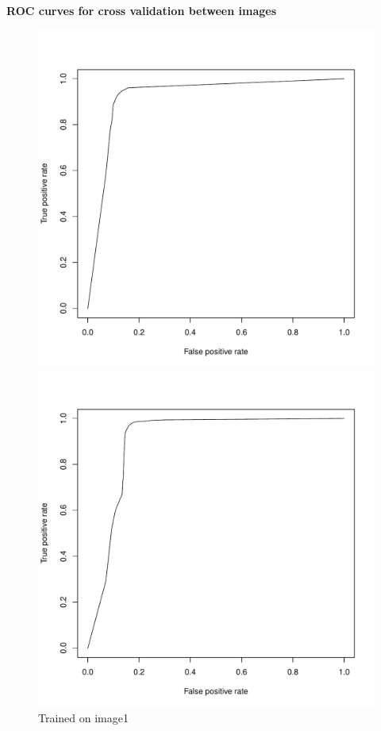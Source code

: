 \documentclass{article}\usepackage[]{graphicx}\usepackage[]{color}
\begin{document}
{\bf ROC curves for cross validation between images} 

\begin{figure}[h]
  \includegraphics[width=\linewidth]{ROC_image1.pdf}
  \caption{Trained on image1}\label{}
\endminipage\hfill
{}
  \includegraphics[width=\linewidth]{ROC_image4.pdf}

\end{figure}
\end{document}
